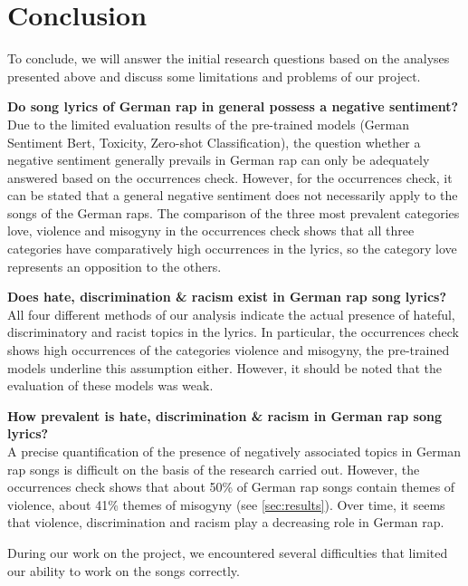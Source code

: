 \section{Conclusion}\label{sec:conclusion}

To conclude, we will answer the initial research questions based on the analyses presented above and discuss some limitations and problems of our project.

\begin{questions}
    \item \textbf{Do song lyrics of German rap in general possess a negative sentiment?} \\
    Due to the limited evaluation results of the pre-trained models (German Sentiment Bert, Toxicity, Zero-shot Classification), the question whether a negative sentiment generally prevails in German rap can only be adequately answered based on the occurrences check. However, for the occurrences check, it can be stated that a general negative sentiment does not necessarily apply to the songs of the German raps. The comparison of the three most prevalent categories love, violence and misogyny in the occurrences check shows that all three categories have comparatively high occurrences in the lyrics, so the category love represents an opposition to the others. 
    \item \textbf{Does hate, discrimination \& racism exist in German rap song lyrics?} \\
    All four different methods of our analysis indicate the actual presence of hateful, discriminatory and racist topics in the lyrics. In particular, the occurrences check shows high occurrences of the categories violence and misogyny, the pre-trained models underline this assumption either. However, it should be noted that the evaluation of these models was weak.
    \item \textbf{How prevalent is hate, discrimination \& racism in German rap song lyrics?} \\
    A precise quantification of the presence of negatively associated topics in German rap songs is difficult on the basis of the research carried out. However, the occurrences check shows that about 50\% of German rap songs contain themes of violence, about 41\% themes of misogyny (see \autoref{sec:results}). Over time, it seems that violence, discrimination and racism play a decreasing role in German rap.
\end{questions}

During our work on the project, we encountered several difficulties that limited our ability to work on the songs correctly.

